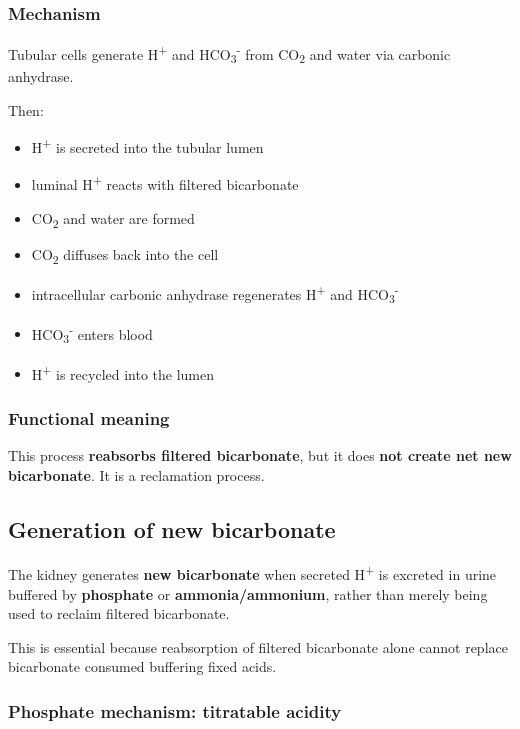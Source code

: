 \documentclass[11pt,a4paper]{article}
\begin{document}
\subsubsection{Mechanism}

Tubular cells generate H\textsuperscript{+} and HCO\textsubscript{3}\textsuperscript{-} from CO\textsubscript{2} and water via carbonic anhydrase.

Then:
\begin{itemize}
  \item H\textsuperscript{+} is secreted into the tubular lumen
  \item luminal H\textsuperscript{+} reacts with filtered bicarbonate
  \item CO\textsubscript{2} and water are formed
  \item CO\textsubscript{2} diffuses back into the cell
  \item intracellular carbonic anhydrase regenerates H\textsuperscript{+} and HCO\textsubscript{3}\textsuperscript{-}
  \item HCO\textsubscript{3}\textsuperscript{-} enters blood
  \item H\textsuperscript{+} is recycled into the lumen
\end{itemize}

\subsubsection{Functional meaning}

This process \textbf{reabsorbs filtered bicarbonate}, but it does \textbf{not create net new bicarbonate}. It is a reclamation process.

\subsection{Generation of new bicarbonate}

The kidney generates \textbf{new bicarbonate} when secreted H\textsuperscript{+} is excreted in urine buffered by \textbf{phosphate} or \textbf{ammonia/ammonium}, rather than merely being used to reclaim filtered bicarbonate.

This is essential because reabsorption of filtered bicarbonate alone cannot replace bicarbonate consumed buffering fixed acids.

\subsubsection{Phosphate mechanism: titratable acidity}
\end{document}

